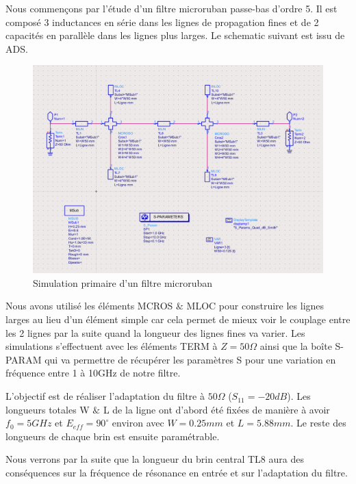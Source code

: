 \documentclass[a4paper]{article}
\begin{document}
Nous commen\c cons par l'\'etude d'un filtre microruban passe-bas d'ordre 5.
Il est compos\'e 3 inductances en s\'erie dans les lignes de propagation fines et de 2 capacit\'es en parall\`ele dans les lignes plus larges.
Le schematic suivant est issu de ADS.

\begin{figure}[!htb]
\begin{center}
  \includegraphics[scale=0.43]{general_schematic.png}
  \caption{Simulation primaire d'un filtre microruban}
\end{center}
\end{figure}

Nous avons utilis\'e les \'el\'ements MCROS $\&$ MLOC pour construire les lignes larges au lieu d'un \'el\'ement simple car cela
 permet de mieux voir le couplage entre les 2 lignes par la suite quand la longueur des lignes fines va varier.
Les simulations s'effectuent avec les \'el\'ements TERM \`a $Z=50 \Omega$ ainsi que la bo\^ite S-PARAM qui va permettre de r\'ecup\'erer
les param\`etres S pour une variation en fr\'equence entre 1 \`a 10GHz de notre filtre.

L'objectif est de r\'ealiser l'adaptation du filtre \`a $50 \Omega$  ($S_{11} = -20 dB$). Les longueurs totales W $\&$ L de la ligne
ont d'abord \'et\'e fix\'ees de mani\`ere \`a avoir $f_0 = 5 GHz$ et $E_{eff} = 90^{\circ}$ environ avec $W=0.25 mm$ et $L = 5.88mm$.
Le reste des longueurs de chaque brin est ensuite param\'etrable.

Nous verrons par la suite que la longueur du brin central TL8 aura des cons\'equences sur
la fr\'equence de r\'esonance en entr\'ee et sur l'adaptation du filtre.
\end{document}

